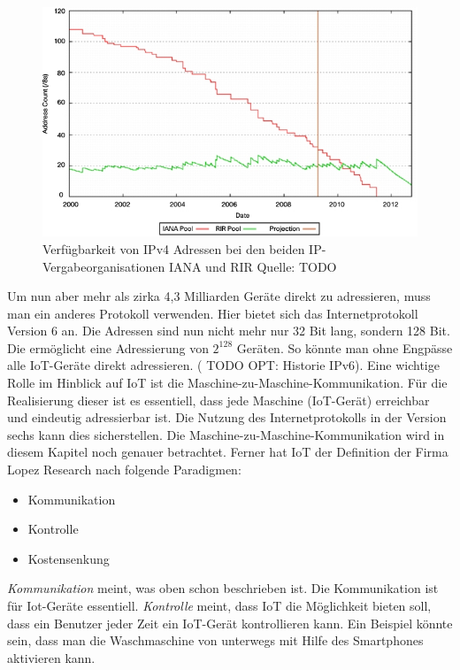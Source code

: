 \begin{figure}
\includegraphics[scale=0.7]{bilder/ipv4cisco} 
\caption{Verfügbarkeit von IPv4 Adressen bei den beiden IP-Vergabeorganisationen IANA und RIR Quelle: TODO}
\label{IPv4}
\end{figure}

Um nun aber mehr als zirka 4,3 Milliarden Geräte direkt zu adressieren, muss man ein anderes Protokoll verwenden. Hier bietet sich das Internetprotokoll Version 6 an. Die Adressen sind nun nicht mehr nur 32 Bit lang, sondern 128 Bit. Die ermöglicht eine Adressierung von $2^{128}$ Geräten. So könnte man ohne Engpässe alle IoT-Geräte direkt adressieren. ( TODO OPT: Historie IPv6). 
Eine wichtige Rolle im Hinblick auf IoT ist die Maschine-zu-Maschine-Kommunikation. Für die Realisierung dieser ist es essentiell, dass jede Maschine (IoT-Gerät) erreichbar und eindeutig adressierbar ist. Die Nutzung des Internetprotokolls in der Version sechs kann dies sicherstellen. Die Maschine-zu-Maschine-Kommunikation wird in diesem Kapitel noch genauer betrachtet.     
Ferner hat IoT der Definition der Firma Lopez Research nach folgende Paradigmen:
\begin{itemize}
\item Kommunikation
\item Kontrolle
\item Kostensenkung
\end{itemize} 
\textit{Kommunikation} meint, was oben schon beschrieben ist. Die Kommunikation ist für Iot-Geräte essentiell. \textit{Kontrolle} meint, dass IoT die Möglichkeit bieten soll, dass ein Benutzer jeder Zeit ein IoT-Gerät kontrollieren kann. Ein Beispiel könnte sein, dass man die Waschmaschine von unterwegs mit Hilfe des Smartphones aktivieren kann. 

